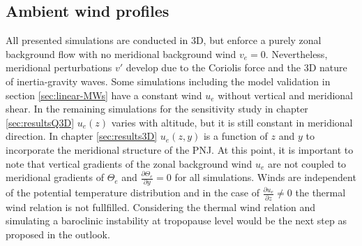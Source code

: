 \subsection*{Ambient wind profiles}
All presented simulations are conducted in 3D, but enforce a purely zonal background flow with no meridional background wind $v_e=0$. Nevertheless, meridional perturbations $v'$ develop due to the Coriolis force and the 3D nature of inertia-gravity waves. Some simulations including the model validation in section \ref{sec:linear-MWs} have a constant wind $u_e$ without vertical and meridional shear. In the remaining simulations for the sensitivity study in chapter \ref{sec:resultsQ3D} $u_e(z)$ varies with altitude, but it is still constant in meridional direction. In chapter \ref{sec:results3D} $u_e(z,y)$ is a function of $z$ and $y$ to incorporate the meridional structure of the PNJ. At this point, it is important to note that vertical gradients of the zonal background wind $u_e$ are not coupled to meridional gradients of $\Theta_e$ and $\frac{\partial \Theta_e}{\partial y}=0$ for all simulations. Winds are independent of the potential temperature distribution and in the case of $\frac{\partial u_e}{\partial z} \neq 0$ the thermal wind relation is not fullfilled. Considering the thermal wind relation and simulating a baroclinic instability at tropopause level would be the next step as proposed in the outlook.

